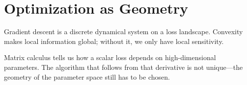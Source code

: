 \chapter{Optimization as Geometry}
\label{ch:optimization}

Gradient descent is a discrete dynamical system on a loss landscape. Convexity makes local information global; without it, we only have local sensitivity.

Matrix calculus tells us how a scalar loss depends on high-dimensional parameters. The algorithm that follows from that derivative is not unique---the geometry of the parameter space still has to be chosen.
